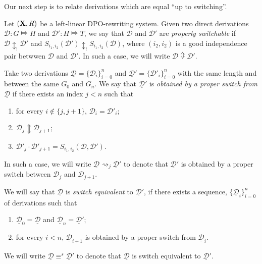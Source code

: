 \documentclass[a4paper,UKenglish,cleveref,pdftex, thm-restate,numberwithinsect]{lipics}
\def\R{\mathsf{R}}
\def\X{\textbf {\textup{X}}}
\newcommand{\dder}[1]{\mathscr{#1}}
\newcommand{\der}[1]{\underline{\dder{#1}}}
\begin{document}
Our next step is to relate derivations which are equal ``up to switching''.

\begin{definition}
  \label{de:switchable}
  Let $(\X, \R)$ be a left-linear DPO-rewriting system. Given two
  direct derivations $\dder{D}\colon G\Mapsto H$ and
  $\dder{D}'\colon H\Mapsto T$, we say that $\dder{D}$ and $\dder{D}'$
  are \emph{properly switchable} if $\dder{D}\updownarrow_! \dder{D'}$
  and $S_{i_1,i_2}(\dder{D}')\updownarrow_!S_{i_1,i_2}(\dder{D})$,
  where $(i_2,i_2)$ is a good independence pair betwwen $\dder{D}$ and
  $\dder{D}'$. In such a case, we will write
  $\dder{D}\Updownarrow\dder{D}'$.
	
Take two derivations $\der{D}=\{\dder{D}_{i}\}_{i=0}^n$ and $\der{D}'=\{\dder{D}'_{i}\}_{i=0}^n$ with the same length and between the same $G_0$ and $G_n$. We say that $\der{D}'$ is \emph{obtained by a proper switch from $\der{D}$} if there exists an index $j < n$ such that
	\begin{enumerate}
\item for every $i\notin \{j, j+1\} $, $\dder{D}_i=\dder{D}'_i$;
\item $\dder{D}_j \Updownarrow \dder{D}_{j+1}$;		
\item $\dder{D}'_j\cdot \dder{D}'_{j+1} = S_{i_1,i_2}(\dder{D}, \dder{D}')$.
	\end{enumerate}
	In such a case, we will write $\der{D}\rightsquigarrow_j \der{D}'$ to denote that $\der{D}'$ is obtained by a proper switch between $\dder{D}_j$ and $\dder{D}_{j+1}$. 
	
	We will say that $\der{D}$ is \emph{switch equivalent} to $\der{D}'$, if there exists a sequence, $\{\der{D}_i\}_{i=0}^n$ of derivations such that
	\begin{enumerate}
		\item $\der{D}_0=\der{D}$ and $\der{D}_n=\der{D}'$;
		\item for every $i< n$, $\der{D}_{i+1}$ is obtained by a proper switch from $\der{D}_i$.
	\end{enumerate}
	
	We will write $\der{D} \equiv^s \der{D}'$ to denote that $\der{D}$ is switch equivalent to $\der{D}'$.
\end{definition}


\begin{example}
\end{example}
\end{document}
